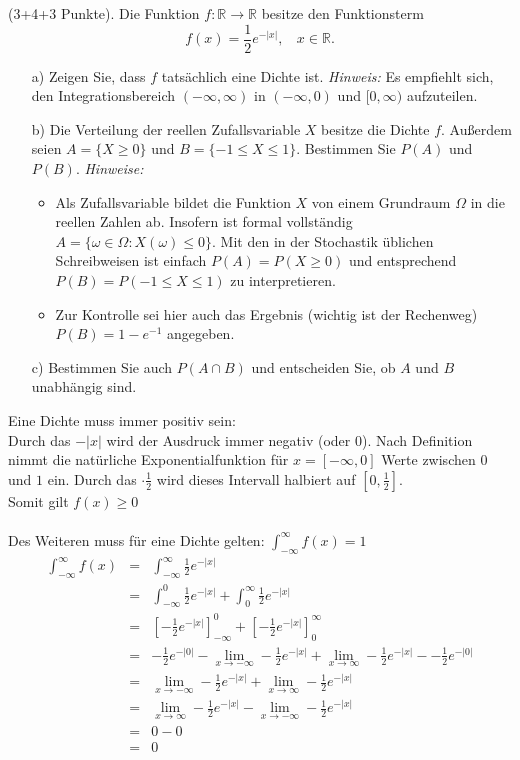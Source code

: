 \documentclass[twoside]{article}
\begin{document}
(3+4+3 Punkte).
Die Funktion $f: \mathbb{R} \rightarrow \mathbb{R}$ besitze den Funktionsterm
\[
	f(x)=\frac{1}{2}e^{-|x|},~~~~x \in \mathbb{R}.
\]
\begin{enumerate}
	\item[a)]	Zeigen Sie, dass $f$ tatsächlich eine Dichte ist.
				\textit{Hinweis:} Es empfiehlt sich, den Integrationsbereich $(-\infty, \infty)$ in $(-\infty, 0)$ und $[0, \infty)$ aufzuteilen.
	\item[b)]	Die Verteilung der reellen Zufallsvariable $X$ besitze die Dichte $f$.
				Außerdem seien $A=\{X \geq 0\}$ und $B=\{-1 \leq X \leq 1\}$.
				Bestimmen Sie $P(A)$ und $P(B)$.
				\textit{Hinweise:}
				\begin{itemize}
					\item	Als Zufallsvariable bildet die Funktion $X$ von einem Grundraum $\Omega$ in die reellen Zahlen ab.
							Insofern ist formal vollständig $A=\{\omega \in \Omega: X(\omega) \leq 0\}$.
							Mit den in der Stochastik üblichen Schreibweisen ist einfach $P(A)=P(X \geq 0)$ und entsprechend $P(B)=P(-1\leq X \leq 1)$ zu interpretieren.
					\item	Zur Kontrolle sei hier auch das Ergebnis (wichtig ist der Rechenweg) $P(B)=1-e^{-1}$ angegeben.
				\end{itemize}
	\item[c)]	Bestimmen Sie auch $P(A \cap B)$ und entscheiden Sie, ob $A$ und $B$ unabhängig sind.
\end{enumerate}
\sss
Eine Dichte muss immer positiv sein:\\
Durch das $-|x|$ wird der Ausdruck immer negativ (oder $0$).
Nach Definition nimmt die natürliche Exponentialfunktion für $x=[-\infty,0]$ Werte zwischen $0$ und $1$ ein.
Durch das $\cdot\frac{1}{2}$ wird dieses Intervall halbiert auf $[0,\frac{1}{2}]$.\\
Somit gilt $f(x)\geq0$\\
\\
Des Weiteren muss für eine Dichte gelten: $\int_{-\infty}^{\infty}f(x)=1$\\
\[
    \begin{array}{rll}
        \int_{-\infty}^{\infty}f(x)&=&\int_{-\infty}^{\infty}\frac{1}{2}e^{-|x|}\\
            &=&\int_{-\infty}^{0}\frac{1}{2}e^{-|x|}+\int_{0}^{\infty}\frac{1}{2}e^{-|x|}\\
            &=&\left[-\frac{1}{2}e^{-|x|}\right]_{-\infty}^{0}+\left[-\frac{1}{2}e^{-|x|}\right]_{0}^{\infty}\\
            &=&-\frac{1}{2}e^{-|0|}-\lim_{x\rightarrow-\infty}-\frac{1}{2}e^{-|x|}+\lim_{x\rightarrow\infty}-\frac{1}{2}e^{-|x|}--\frac{1}{2}e^{-|0|}\\
            &=&\lim_{x\rightarrow-\infty}-\frac{1}{2}e^{-|x|}+\lim_{x\rightarrow\infty}-\frac{1}{2}e^{-|x|}\\
            &=&\lim_{x\rightarrow\infty}-\frac{1}{2}e^{-|x|}-\lim_{x\rightarrow-\infty}-\frac{1}{2}e^{-|x|}\\
            &=&0-0\\
            &=&0
    \end{array}
\]
\end{document}
